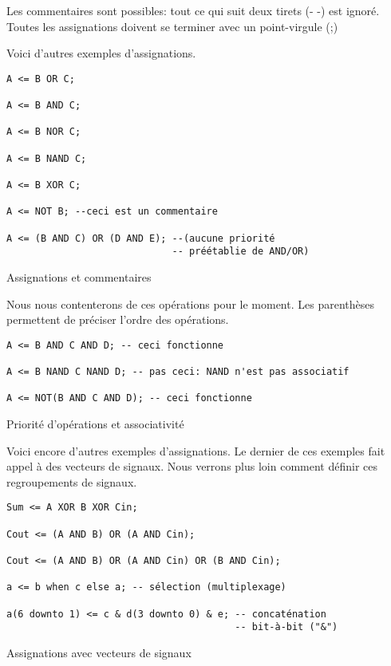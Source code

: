 \documentclass[11pt]{article}
\begin{document}
Les commentaires sont possibles: tout ce qui suit deux tirets (- -)
est ignoré.  Toutes les assignations doivent se terminer avec un
point-virgule (;)

Voici d'autres exemples d'assignations.

\begin{listing}[htbp]
\begin{verbatim}
A <= B OR C;

A <= B AND C;

A <= B NOR C;

A <= B NAND C;

A <= B XOR C;

A <= NOT B; --ceci est un commentaire

A <= (B AND C) OR (D AND E); --(aucune priorité 
                             -- préétablie de AND/OR)
\end{verbatim}
\caption{Assignations et commentaires}
\end{listing}

Nous nous contenterons de ces opérations pour le moment. Les
parenthèses permettent de préciser l'ordre des opérations.

\begin{listing}[htbp]
\begin{verbatim}
A <= B AND C AND D; -- ceci fonctionne

A <= B NAND C NAND D; -- pas ceci: NAND n'est pas associatif

A <= NOT(B AND C AND D); -- ceci fonctionne
\end{verbatim}
\caption{Priorité d'opérations et associativité}
\end{listing}

Voici encore d'autres exemples d'assignations.  Le dernier de ces
exemples fait appel à des vecteurs de signaux. Nous verrons plus loin
comment définir ces regroupements de signaux.


\begin{listing}[htbp]
\begin{verbatim}
Sum <= A XOR B XOR Cin;

Cout <= (A AND B) OR (A AND Cin);

Cout <= (A AND B) OR (A AND Cin) OR (B AND Cin);

a <= b when c else a; -- sélection (multiplexage)

a(6 downto 1) <= c & d(3 downto 0) & e; -- concaténation 
                                        -- bit-à-bit ("&")

\end{verbatim}
\caption{Assignations avec vecteurs de signaux}
\end{listing}
\end{document}
